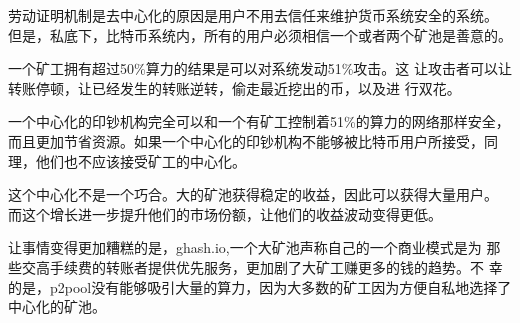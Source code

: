 \documentclass[letterpaper]{article}
\begin{document}
劳动证明机制是去中心化的原因是用户不用去信任来维护货币系统安全的系统。
但是，私底下，比特币系统内，所有的用户必须相信一个或者两个矿池是善意的。

一个矿工拥有超过50\%算力的结果是可以对系统发动51\%攻击\cite{51pct}。这
让攻击者可以让转账停顿，让已经发生的转账逆转，偷走最近挖出的币，以及进
行双花\cite{centralized}。

一个中心化的印钞机构完全可以和一个有矿工控制着51\%的算力的网络那样安全，
而且更加节省资源。如果一个中心化的印钞机构不能够被比特币用户所接受，同
理，他们也不应该接受矿工的中心化。


这个中心化不是一个巧合。大的矿池获得稳定的收益，因此可以获得大量用户。
而这个增长进一步提升他们的市场份额，让他们的收益波动变得更低。

让事情变得更加糟糕的是，ghash.io,一个大矿池声称自己的一个商业模式是为
那些交高手续费的转账者提供优先服务，更加剧了大矿工赚更多的钱的趋势。不
幸的是，p2pool没有能够吸引大量的算力，因为大多数的矿工因为方便自私地选择了中心化的矿池。
\end{document}
